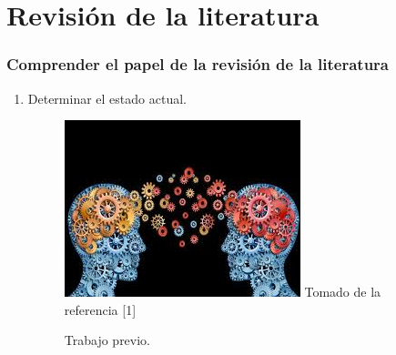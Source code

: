 \documentclass{beamer}
\begin{document}
\section{Revisi\'on de la literatura} %
    \begin{frame}
        \frametitle{Comprender el papel de la revisi\'on de la literatura} 
        \begin{multicols}{2}
          
                \begin{enumerate}
                    \item Determinar el estado actual.
                        \begin{figure}
                            \includegraphics[scale=0.50]{figures/prework}
                            \newline
                            {\tiny Tomado de la referencia [1] }
                            \caption{ Trabajo previo. }
                        \end{figure}
            

\end{enumerate}
\end{multicols}
\end{frame}
\end{document}
